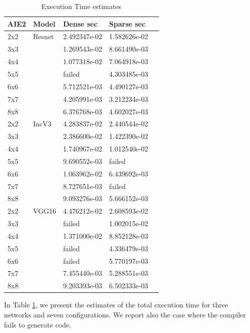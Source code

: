 \documentclass[conference]{IEEEtran}
\begin{document}
\begin{table}[htb]
  \caption{Execution Time estimates}
  \label{tab_perf}
\begin{center} 
\begin{tabular}{|l|l|l|l|l|}
  \hline
  AIE2 & Model  & Dense sec      & Sparse sec      \\ \hline\hline
  2x2   & Resnet & 2.492347e-02  & 1.582626e-02 \\ \hline
  3x3   &  & 1.269543e-02  & 8.661490e-03 \\ \hline
  4x4   &  &  1.077318e-02 & 7.064918e-03 \\ \hline
  5x5   &  &  failed       & 4.303485e-03 \\ \hline
  6x6   &  &  5.712521e-03 & 4.490127e-03 \\ \hline
  7x7   &  &  4.205991e-03 & 3.212234e-03 \\ \hline
  8x8   &  &  6.376768e-03 & 4.602027e-03 \\ \hline \hline
  2x2   & IncV3  & 4.283837e-02  & 2.440544e-02 \\ \hline
  3x3   &   & 2.386600e-02  & 1.422390e-02 \\ \hline
  4x4   &   &  1.740967e-02 & 1.012540e-02 \\ \hline
  5x5   &   &  9.690552e-03 & failed       \\ \hline
  6x6   &   &  1.063962e-02 & 6.439692e-03 \\ \hline
  7x7   &   &  8.727651e-03 & failed       \\ \hline
  8x8   &   &  9.093276e-03 & 5.666152e-03 \\ \hline \hline
  2x2   & VGG16  & 4.476212e-02  & 2.608593e-02 \\ \hline
  3x3   &   & failed        & 1.002015e-02 \\ \hline
  4x4   &   &  1.371000e-02 & 8.852128e-03 \\ \hline
  5x5   &   &  failed       & 4.336479e-03 \\ \hline
  6x6   &   &  failed       & 5.770197e-03 \\ \hline
  7x7   &   &  7.455440e-03 & 5.288551e-03 \\ \hline
  8x8   &   &  9.203393e-03 & 6.502333e-03 \\ \hline \hline
          
\end{tabular}
\end{center}
\end{table}


In Table \ref{tab_perf}, we present the estimates of the total
execution time for three networks and seven configurations. We report
also the case where the compiler fails to generate code.
\end{document}
